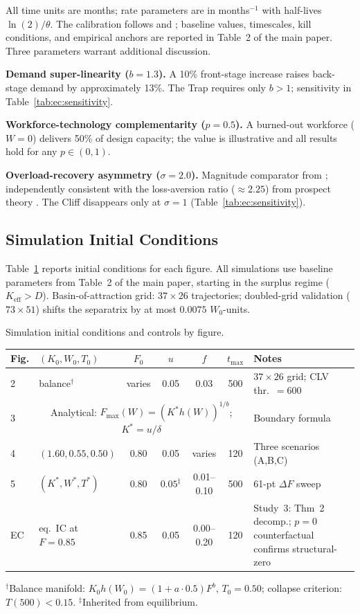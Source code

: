 \documentclass[msom,dblanonrev]{informs4}
\newcommand{\Keff}{K_{\mathrm{eff}}}
\begin{document}
All time units are months; rate parameters are in months$^{-1}$ with half-lives $\ln(2)/\theta$. The calibration follows \citet{homer1993partial} and \citet{barlas1996formal}; baseline values, timescales, kill conditions, and empirical anchors are reported in Table~2 of the main paper. Three parameters warrant additional discussion.

\textbf{Demand super-linearity ($b = 1.3$).} A 10\% front-stage increase raises back-stage demand by approximately 13\%. The Trap requires only $b > 1$; sensitivity in Table~\ref{tab:ec:sensitivity}.

\textbf{Workforce-technology complementarity ($p = 0.5$).} A burned-out workforce ($W = 0$) delivers 50\% of design capacity; the value is illustrative and all results hold for any $p \in (0,1)$.

\textbf{Overload-recovery asymmetry ($\sigma = 2.0$).} Magnitude comparator from \citet{oliva2001cutting}; independently consistent with the loss-aversion ratio (${\approx}2.25$) from prospect theory \citep{tversky1992advances}. The Cliff disappears only at $\sigma = 1$ (Table~\ref{tab:ec:sensitivity}).

\subsection{Simulation Initial Conditions}

Table~\ref{tab:ec:simparams} reports initial conditions for each figure. All simulations use baseline parameters from Table~2 of the main paper, starting in the surplus regime ($\Keff > D$). Basin-of-attraction grid: $37{\times}26$ trajectories; doubled-grid validation ($73{\times}51$) shifts the separatrix by at most $0.0075$ $W_0$-units.

\begin{table}
\TABLE
{Simulation initial conditions and controls by figure.\label{tab:ec:simparams}}
{{\footnotesize\setlength{\tabcolsep}{2.5pt}%
\begin{tabular}{@{}lp{}ccccp{}@{}}
\toprule
Fig. & $(K_0, W_0, T_0)$ & $F_0$ & $u$ & $f$ & $t_{\max}$ & Notes \\
\midrule
2 & balance$^{\dagger}$ & varies & 0.05 & 0.03 & 500 & $37{\times}26$ grid; CLV thr.\ $=600$ \\
3 & \multicolumn{5}{c}{Analytical: $F_{\max}(W)=(K^* h(W))^{1/b}$; $K^*=u/\delta$} & Boundary formula \\
4 & $(1.60, 0.55, 0.50)$ & 0.80 & 0.05 & varies & 120 & Three scenarios (A,B,C) \\
5 & $(K^*\!,W^*\!,T^*)$ & 0.80 & $0.05^{\ddagger}$ & 0.01--0.10 & 500 & 61-pt $\Delta F$ sweep \\
EC & eq.~IC at $F{=}0.85$ & 0.85 & 0.05 & 0.00--0.20 & 120 & Study~3: Thm~2 decomp.; $p{=}0$ counterfactual confirms structural-zero \\
\bottomrule
\end{tabular}}}
{$^{\dagger}$Balance manifold: $K_0 h(W_0)=(1{+}a{\cdot}0.5)F^b$, $T_0{=}0.50$; collapse criterion: $T(500){<}0.15$. $^{\ddagger}$Inherited from equilibrium.}
\end{table}
\end{document}
